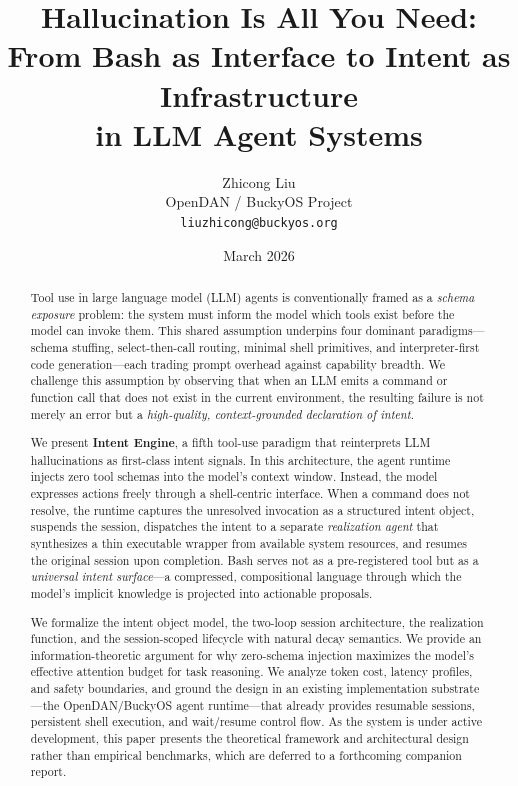 \documentclass[11pt]{article}
\title{Hallucination Is All You Need:\\
From Bash as Interface to Intent as Infrastructure\\
in LLM Agent Systems}
\author{
  Zhicong Liu \\
  OpenDAN / BuckyOS Project \\
  \texttt{liuzhicong@buckyos.org}
}
\date{March 2026}
\begin{document}
\maketitle

\begin{abstract}
Tool use in large language model (LLM) agents is conventionally framed as a \emph{schema exposure} problem: the system must inform the model which tools exist before the model can invoke them.
This shared assumption underpins four dominant paradigms---schema stuffing, select-then-call routing, minimal shell primitives, and interpreter-first code generation---each trading prompt overhead against capability breadth.
We challenge this assumption by observing that when an LLM emits a command or function call that does not exist in the current environment, the resulting failure is not merely an error but a \emph{high-quality, context-grounded declaration of intent}.

We present \textbf{Intent Engine}, a fifth tool-use paradigm that reinterprets LLM hallucinations as first-class intent signals.
In this architecture, the agent runtime injects zero tool schemas into the model's context window. Instead, the model expresses actions freely through a shell-centric interface.
When a command does not resolve, the runtime captures the unresolved invocation as a structured intent object, suspends the session, dispatches the intent to a separate \emph{realization agent} that synthesizes a thin executable wrapper from available system resources, and resumes the original session upon completion.
Bash serves not as a pre-registered tool but as a \emph{universal intent surface}---a compressed, compositional language through which the model's implicit knowledge is projected into actionable proposals.

We formalize the intent object model, the two-loop session architecture, the realization function, and the session-scoped lifecycle with natural decay semantics.
We provide an information-theoretic argument for why zero-schema injection maximizes the model's effective attention budget for task reasoning.
We analyze token cost, latency profiles, and safety boundaries, and ground the design in an existing implementation substrate---the OpenDAN/BuckyOS agent runtime---that already provides resumable sessions, persistent shell execution, and wait/resume control flow.
As the system is under active development, this paper presents the theoretical framework and architectural design rather than empirical benchmarks, which are deferred to a forthcoming companion report.
\end{abstract}
\end{document}
